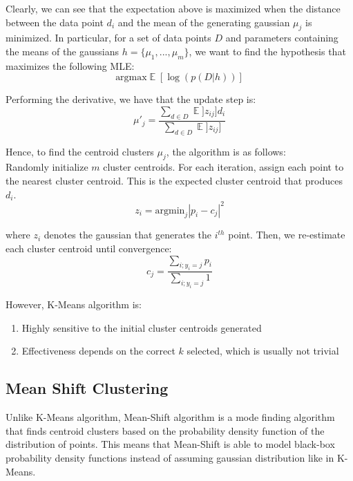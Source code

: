 \documentclass[12pt]{article}
\DeclareMathOperator{\E}{\mathbb{E}}
\begin{document}
Clearly, we can see that the expectation above is maximized when the distance between the data point $d_i$ and the mean of the generating gaussian $\mu_j$ is minimized. In particular, for a set of data points $D$ and parameters containing the means of the gaussians $h = \{ \mu_1, ..., \mu_m \}$, we want to find the hypothesis that maximizes the following MLE:
\begin{equation}
\text{argmax} \E[\log (p(D|h))]
\end{equation} 

Performing the derivative, we have that the update step is: 
\begin{equation}
\mu'_j = \frac{\sum_{d \in D} \E]z_{ij}] d_i}{\sum_{d \in D} \E]z_{ij}]}
\end{equation}

Hence, to find the centroid clusters $\mu_j$, the algorithm is as follows:\\

Randomly initialize $m$ cluster centroids.
For each iteration, assign each point to the nearest cluster centroid. This is the expected cluster centroid that produces $d_i$.
\begin{equation}
z_i = \text{argmin}_{j} |p_i - c_j|^2
\end{equation}

where $z_i$ denotes the gaussian that generates the $i^{th}$ point. Then, we re-estimate each cluster centroid until convergence:
\begin{equation}
c_j = \frac{\sum_{i; y_i = j} p_i}{\sum_{i; y_i = j} 1}
\end{equation}

However, K-Means algorithm is:
\begin{enumerate}
\item Highly sensitive to the initial cluster centroids generated
\item Effectiveness depends on the correct $k$ selected, which is usually not trivial
\end{enumerate}

\subsection{Mean Shift Clustering}

Unlike K-Means algorithm, Mean-Shift algorithm is a mode finding algorithm that finds centroid clusters based on the probability density function of the distribution of points. This means that Mean-Shift is able to model black-box probability density functions instead of assuming gaussian distribution like in K-Means.\\
\end{document}
